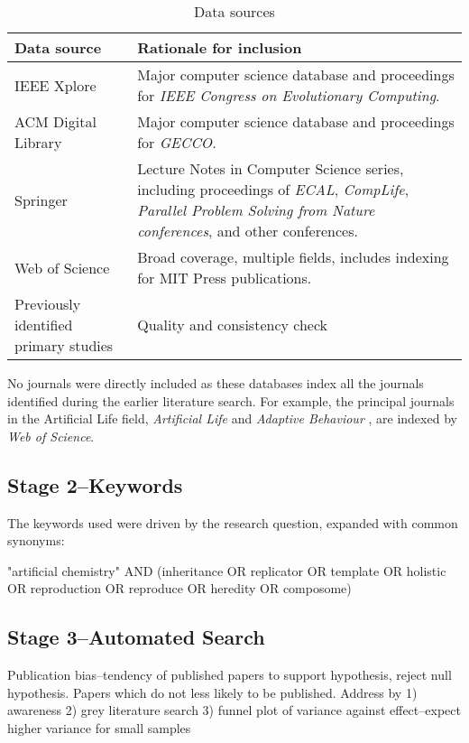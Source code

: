 \begin{table}
	\footnotesize
	\begin{center}
		\begin{tabular}{@{}p{4cm}p{9cm}@{}}
			\toprule
			Data source & Rationale for inclusion\\
			\midrule
			IEEE Xplore & Major computer science database and proceedings for \textit{IEEE Congress on Evolutionary Computing}.\\
			ACM Digital Library & Major computer science database and proceedings for \textit{GECCO}.\\
			Springer & Lecture Notes in Computer Science series, including proceedings of \textit{ECAL}, \textit{CompLife}, \textit{Parallel Problem Solving from Nature conferences}, and other conferences.\\
			Web of Science & Broad coverage, multiple fields, includes indexing for MIT Press publications.\\
			Previously identified primary studies & Quality and consistency check\\
			\bottomrule
		\end{tabular}
	\end{center}
	\caption{Data sources}
\end{table}

No journals were directly included as these databases index all the journals identified during the earlier literature search. For example, the principal journals in the Artificial Life field, \emph{Artificial Life} and \emph{Adaptive Behaviour} \parencite{Aicardi2010}, are indexed by \textit{Web of Science}.

\subsection{Stage 2--Keywords}

The keywords used were driven by the research question, expanded with common synonyms:

"artificial chemistry" AND (inheritance OR replicator OR template OR holistic OR reproduction OR reproduce OR heredity OR composome)

\subsection{Stage 3--Automated Search}

Publication bias--tendency of published papers to support hypothesis, reject null hypothesis. Papers which do not less likely to be published. Address by 1) awareness 2) grey literature search 3) funnel plot of variance against effect--expect higher variance for small samples

